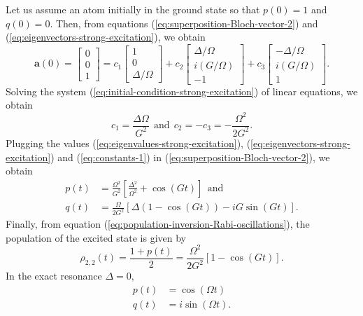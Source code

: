 Let us assume an atom initially in the ground state so that $ p(0) = 1 $ and $ q(0) = 0 $. Then, from equations (\ref{eq:superposition-Bloch-vector-2}) and (\ref{eq:eigenvectors-strong-excitation}), we obtain
\begin{equation}
	\mathbf{a}(0) = \left[ \begin{matrix} 0 \\ 0 \\ 1 \end{matrix} \right] = c_1 \left[ \begin{matrix} 1 \\ 0 \\ \Delta / \Omega \end{matrix} \right] + c_2 \left[ \begin{matrix} \Delta / \Omega \\ i(G / \Omega) \\ -1 \end{matrix} \right] + c_3 \left[ \begin{matrix} -\Delta / \Omega \\ i(G / \Omega) \\ 1 \end{matrix} \right].
	\label{eq:initial-condition-strong-excitation}
\end{equation}
Solving the system (\ref{eq:initial-condition-strong-excitation})  of linear equations, we obtain
\begin{equation}
	c_1 = \frac{\Delta\Omega}{G^2}\ \ \textrm{and}\ \ c_2 = - c_3 = -\frac{\Omega^2}{2G^2}.
	\label{eq:constants-1}
\end{equation}
Plugging the values (\ref{eq:eigenvalues-strong-excitation}), (\ref{eq:eigenvectors-strong-excitation}) and (\ref{eq:constants-1}) in (\ref{eq:superposition-Bloch-vector-2}), we obtain
\begin{align}
	p(t) &= \frac{\Omega^2}{G^2}\left[\frac{\Delta^2}{\Omega^2} + \cos(Gt) \right]\ \ \textrm{and}
	\label{eq:population-inversion-Rabi-oscillations}
	\\
	q(t) &= \frac{\Omega}{2G^2}[\Delta(1 -  \cos(Gt)) - i G \sin(Gt)].
	\label{eq:coherence-Rabi-oscillations}
\end{align}
Finally, from equation (\ref{eq:population-inversion-Rabi-oscillations}), the population of the excited state is given by
\begin{equation}
	\rho_{2,2}(t) = \frac{1 + p(t)}{2} = \frac{\Omega^2}{2G^2}[1 - \cos(G t)].
	\label{eq:Rabi-oscillations-excited-state}
\end{equation}
In the exact resonance $ \Delta = 0 $,
\begin{align}
	p(t) &= \cos(\Omega t)
	\label{eq:population-inversion-exact-resonance-strong-excitation}
	\\
	q(t) &= i \sin(\Omega t).
	\label{eq:coherence-exact-resonance-strong-excitation}
\end{align}

